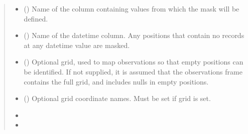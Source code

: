 \documentclass[letterpaper,10pt,english]{sphinxmanual}
\begin{document}
\begin{fulllineitems}
\begin{quote}
\begin{description}
\begin{itemize}
\item {}
\sphinxAtStartPar
{} () \textendash{} Name of the column containing values from which the mask will be
defined.

\item {}
\sphinxAtStartPar
{} () \textendash{} Name of the datetime column. Any positions that contain no records at
any datetime value are masked.

\item {}
\sphinxAtStartPar
{} () \textendash{} Optional grid, used to map observations so that empty positions can be
identified. If not supplied, it is assumed that the observations frame
contains the full grid, and includes nulls in empty positions.

\item {}
\sphinxAtStartPar
{} () \textendash{} Optional grid coordinate names. Must be set if grid is set.

\end{itemize}

\sphinxAtStartPar
{}

\sphinxAtStartPar
\begin{itemize}
\item {}
\sphinxAtStartPar
{}

\item {}
\sphinxAtStartPar
{}

\end{itemize}


\end{description}\end{quote}

\end{fulllineitems}
\end{document}

